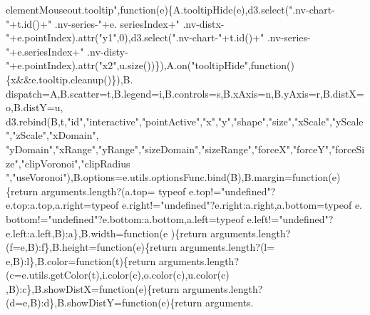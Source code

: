 \begin{DoxyCode}
{      elementMouseout.tooltip"},\textcolor{keyword}{function}(e)\{A.tooltipHide(e),d3.select(\textcolor{stringliteral}{".nv-chart-"}+t.id()+\textcolor{stringliteral}{" .nv-series-"}+e.
      seriesIndex+\textcolor{stringliteral}{" .nv-distx-"}+e.pointIndex).attr(\textcolor{stringliteral}{"y1"},0),d3.select(\textcolor{stringliteral}{".nv-chart-"}+t.id()+\textcolor{stringliteral}{" .nv-series-"}+e.seriesIndex+\textcolor{stringliteral}{"
       .nv-disty-"}+e.pointIndex).attr(\textcolor{stringliteral}{"x2"},u.size())\}),A.on(\textcolor{stringliteral}{"tooltipHide"},\textcolor{keyword}{function}()\{x&&e.tooltip.cleanup()\}),B.
      dispatch=A,B.scatter=t,B.legend=i,B.controls=s,B.xAxis=n,B.yAxis=r,B.distX=o,B.distY=u,
      d3.rebind(B,t,\textcolor{stringliteral}{"id"},\textcolor{stringliteral}{"interactive"},\textcolor{stringliteral}{"pointActive"},\textcolor{stringliteral}{"x"},\textcolor{stringliteral}{"y"},\textcolor{stringliteral}{"shape"},\textcolor{stringliteral}{"size"},\textcolor{stringliteral}{"xScale"},\textcolor{stringliteral}{"yScale"},\textcolor{stringliteral}{"zScale"},\textcolor{stringliteral}{"xDomain"},\textcolor{stringliteral}{
      "yDomain"},\textcolor{stringliteral}{"xRange"},\textcolor{stringliteral}{"yRange"},\textcolor{stringliteral}{"sizeDomain"},\textcolor{stringliteral}{"sizeRange"},\textcolor{stringliteral}{"forceX"},\textcolor{stringliteral}{"forceY"},\textcolor{stringliteral}{"forceSize"},\textcolor{stringliteral}{"clipVoronoi"},\textcolor{stringliteral}{"clipRadius
      "},\textcolor{stringliteral}{"useVoronoi"}),B.options=e.utils.optionsFunc.bind(B),B.margin=\textcolor{keyword}{function}(e)\{\textcolor{keywordflow}{return} arguments.length?(a.top=
      typeof e.top!=\textcolor{stringliteral}{"undefined"}?e.top:a.top,a.right=typeof e.right!=\textcolor{stringliteral}{"undefined"}?e.right:a.right,a.bottom=typeof e.
      bottom!=\textcolor{stringliteral}{"undefined"}?e.bottom:a.bottom,a.left=typeof e.left!=\textcolor{stringliteral}{"undefined"}?e.left:a.left,B):a\},B.width=\textcolor{keyword}{function}(e
      )\{\textcolor{keywordflow}{return} arguments.length?(f=e,B):f\},B.height=\textcolor{keyword}{function}(e)\{\textcolor{keywordflow}{return} arguments.length?(l=
      e,B):l\},B.color=\textcolor{keyword}{function}(t)\{\textcolor{keywordflow}{return} arguments.length?(c=e.utils.getColor(t),i.color(c),o.color(c),u.color(c)
      ,B):c\},B.showDistX=\textcolor{keyword}{function}(e)\{\textcolor{keywordflow}{return} arguments.length?(d=e,B):d\},B.showDistY=\textcolor{keyword}{function}(e)\{\textcolor{keywordflow}{return} arguments.

\end{DoxyCode}
